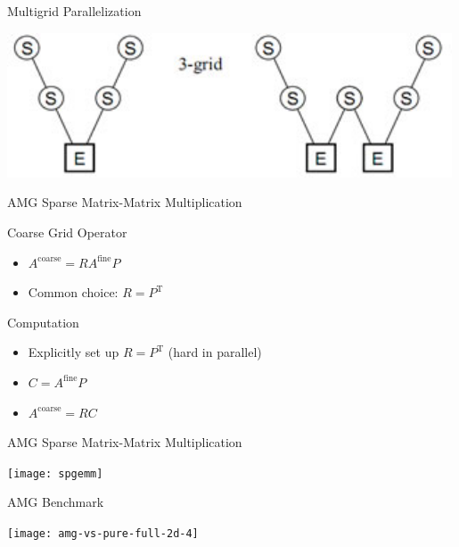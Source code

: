 \begin{frame}{Multigrid Parallelization}
\begin{minipage}{0.4\textwidth}
  \includegraphics[width=0.99\textwidth]{figures/multigrid-cycles.png}
 \end{minipage}

 \vspace*{0.5cm}

\end{frame}



\begin{frame}{AMG Sparse Matrix-Matrix Multiplication}
 \begin{block}{Coarse Grid Operator}
  \begin{itemize}
   \item $A^{\mathrm{coarse}} = R A^{\mathrm{fine}} P$
   \item Common choice: $R = P^{\mathrm{T}}$
  \end{itemize}
 \end{block}

 \begin{block}{Computation}
  \begin{itemize}
   \item Explicitly set up $R = P^{\mathrm{T}}$ (hard in parallel)
   \item $C = A^{\mathrm{fine}} P$
   \item $A^{\mathrm{coarse}} = R C$
  \end{itemize}
 \end{block}

\end{frame}


\begin{frame}{AMG Sparse Matrix-Matrix Multiplication}
  \begin{center}
    \texttt{[image: spgemm]}
  \end{center}
\end{frame}




\begin{frame}{AMG Benchmark}
  \begin{center}
    \texttt{[image: amg-vs-pure-full-2d-4]}
  \end{center}
\end{frame}
